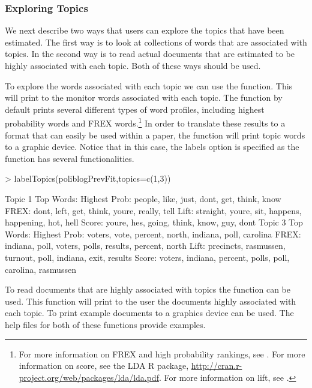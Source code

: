 \documentclass[nojss]{jss}
\begin{document}
\subsubsection{Exploring Topics}

We next describe two ways that users can explore the topics that have been estimated. The first way is to look at collections of words that are associated with topics. In the second way is to read actual documents that are estimated to be highly associated with each topic. Both of these ways should be used.

To explore the words associated with each topic we can use the  function. This will print to the monitor words associated with each topic. The function by default prints several different types of word profiles, including highest probability words and FREX words.\footnote{For more information on FREX and high probability rankings, see \citet{nips2013,STMEdo,ajps,TextComparative}. For more information on score, see the LDA R package, \url{http://cran.r-project.org/web/packages/lda/lda.pdf}. For more information on lift, see \citet{taddy2012multinomial}.}  In order to translate these results to a format that can easily be used within a paper, the  function will print topic words to a graphic device. Notice that in this case, the labels option is specified as the  function has several functionalities.

\begin{Schunk}
\begin{Sinput}
> labelTopics(poliblogPrevFit,topics=c(1,3))
\end{Sinput}
\begin{Soutput}
Topic 1 Top Words:
 	 Highest Prob: people, like, just, dont, get, think, know 
 	 FREX: dont, left, get, think, youre, really, tell 
 	 Lift: straight, youre, sit, happens, happening, hot, hell 
 	 Score: youre, hes, going, think, know, guy, dont 
Topic 3 Top Words:
 	 Highest Prob: voters, vote, percent, north, indiana, poll, carolina 
 	 FREX: indiana, poll, voters, polls, results, percent, north 
 	 Lift: precincts, rasmussen, turnout, poll, indiana, exit, results 
 	 Score: voters, indiana, percent, polls, poll, carolina, rasmussen 
\end{Soutput}
\end{Schunk}

To read documents that are highly associated with topics the  function can be used. This function will print to the user the documents highly associated with each topic. To print example documents to a graphics device  can be used. The help files for both of these functions provide examples.
\end{document}
